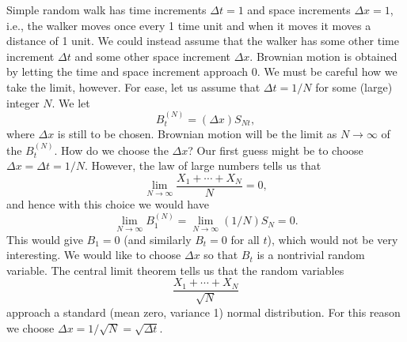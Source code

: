 \documentclass{stml-l}
\theoremstyle{definition}
\numberwithin{equation}{chapter}
\numberwithin{figure}{chapter}
\numberwithin{figure}{section}
\begin{document}
Simple random walk has time increments $\Delta t=1$ and space
increments $\Delta x=1$, i.e., the walker moves once every 1 time
unit and when it moves it moves a distance of 1 unit. We could
instead assume that the walker has some other time increment $\Delta
t$ and some other space increment $\Delta x$. Brownian motion is
obtained by letting the time and space increment approach $0$. We
must be careful how we take the limit, however. For ease, let us
assume that $\Delta t=1/N$ for some (large) integer $N$. We let
\begin{equation*}
B_{t}^{(N)}=(\Delta x)S_{Nt},
\end{equation*}
where $\Delta x$ is still to be chosen. Brownian motion will be the
limit as $ N\rightarrow\infty$ of the $B_{t}^{(N)}$. How do we choose
the $\Delta x$? Our first guess might be to choose $\Delta x=\Delta
t=1/N$. However, the law of large numbers tells us that
\begin{equation*}
\lim\limits_{N\rightarrow\infty}\frac{X_{1}+\cdots+X_{N}}{N}=0,
\end{equation*}
and hence with this choice we would have
\begin{equation*}
\lim\limits_{N\rightarrow\infty}B_{1}^{(N)}=\lim\limits_{N\rightarrow\infty}(1/N)S_{N}=0.
\end{equation*}
This would give $B_{1}=0$ (and similarly $B_{t}=0$ for all $t$),
which would not be very interesting. We would like to choose $\Delta
x$ so that $B_{t}$ is a nontrivial random variable. The central
limit theorem tells us that the random variables
\begin{equation*}
\frac{X_{1}+\cdots+X_{N}}{\sqrt{N}}
\end{equation*}
approach a standard (mean zero, variance 1) normal distribution. For
this reason we choose $\Delta x=1/\sqrt{N}=\sqrt{\Delta t}$.
\end{document}
